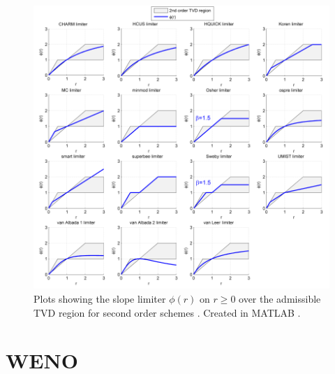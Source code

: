 	\begin{figure}
    		\centering
        		\includegraphics[trim=0 0 0 0,clip,width=\textwidth]{Limiters.png}
		\caption[MUSCL Reconstruction : Slope limiters]{Plots showing the slope limiter $\phi(r)$ on $r\geq0$ over the admissible TVD region for second order schemes \cite{Sweby84}. Created in MATLAB \cite{Griffgruff}.}
		\label{fig:app:slopelims}
	\end{figure}
	

\section{WENO}
\label{ap:WENOreco}

